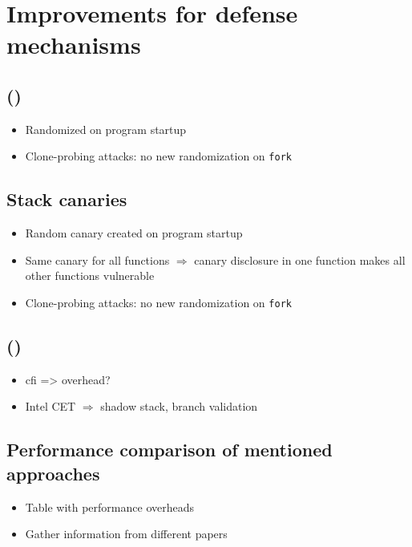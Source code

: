 \chapter{Improvements for defense mechanisms}
\label{chp:defense-mechanism-improvements}

\section{ ()}
\label{sec:aslr-improvements}

\begin{itemize}
	\item{Randomized on program startup}
	\item{Clone-probing attacks: no new randomization on \texttt{fork}}
\end{itemize}

\section{Stack canaries}
\label{sec:stack-canary-improvements}

\begin{itemize}
	\item{Random canary created on program startup}
	\item{Same canary for all functions $\Rightarrow$ canary disclosure in one function makes all other functions vulnerable}
	\item{Clone-probing attacks: no new randomization on \texttt{fork}}
\end{itemize}

\section{ ()}
\label{sec:control-flow-integrity}

\begin{itemize}
	\item{\gls{cfi} => overhead?}
	\item{Intel CET $\Rightarrow$ shadow stack, branch validation}
\end{itemize}

\section{Performance comparison of mentioned approaches}
\label{sec:performance-comparison}

\begin{itemize}
	\item{Table with performance overheads}
	\item{Gather information from different papers}
\end{itemize}

